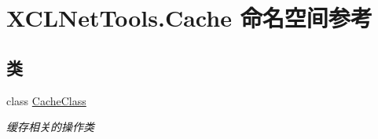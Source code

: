\hypertarget{namespace_x_c_l_net_tools_1_1_cache}{}\section{X\+C\+L\+Net\+Tools.\+Cache 命名空间参考}
\label{namespace_x_c_l_net_tools_1_1_cache}
\subsection*{类}
\begin{DoxyCompactItemize}
\item 
class \hyperlink{class_x_c_l_net_tools_1_1_cache_1_1_cache_class}{Cache\+Class}
\begin{DoxyCompactList}\small\item\em 缓存相关的操作类 \end{DoxyCompactList}\end{DoxyCompactItemize}
